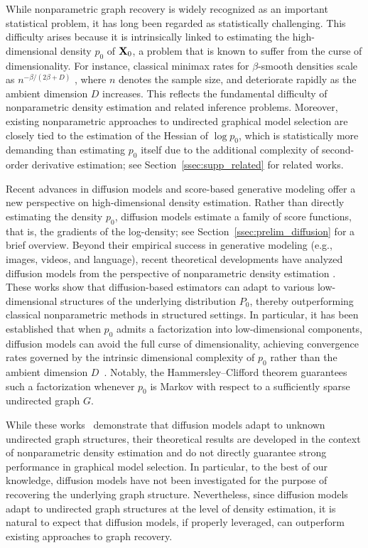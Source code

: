 \documentclass[11pt,a4paper,final]{article}
\numberwithin{equation}{section}
\theoremstyle{remark}
\newcommand{\bX}{{\bf X}}
\begin{document}
While nonparametric graph recovery is widely recognized as an important statistical problem, it has long been regarded as statistically challenging. This difficulty arises because it is intrinsically linked to estimating the high-dimensional density $p_0$ of $\bX_0$, a problem that is known to suffer from the curse of dimensionality. 
For instance, classical minimax rates for $\beta$-smooth densities scale as $n^{-\beta/(2\beta + D)}$ \citep{tsybakov2008introduction}, where $n$ denotes the sample size, and deteriorate rapidly as the ambient dimension $D$ increases. 
This reflects the fundamental difficulty of nonparametric density estimation and related inference problems. 
Moreover, existing nonparametric approaches to undirected graphical model selection are closely tied to the estimation of the Hessian of $\log p_0$, which is statistically more demanding than estimating $p_0$ itself due to the additional complexity of second-order derivative estimation; see Section~\ref{ssec:supp_related} for related works.

Recent advances in diffusion models and score-based generative modeling offer a new perspective on high-dimensional density estimation. 
Rather than directly estimating the density $p_0$, diffusion models estimate a family of score functions, that is, the gradients of the log-density; see Section~\ref{ssec:prelim_diffusion} for a brief overview.
Beyond their empirical success in generative modeling (e.g., images, videos, and language), recent theoretical developments have analyzed diffusion models from the perspective of nonparametric density estimation \citep{oko2023diffusion, kwon2026nonparametric, fan2025optimal, tang2024adaptivity, azangulov2024convergence, stephanovitch2025generalization, chakraborty2026generalization}. 
These works show that diffusion-based estimators can adapt to various low-dimensional structures of the underlying distribution $P_0$, thereby outperforming classical nonparametric methods in structured settings. 
In particular, it has been established that when $p_0$ admits a factorization into low-dimensional components, diffusion models can avoid the full curse of dimensionality, achieving convergence rates governed by the intrinsic dimensional complexity of $p_0$ rather than the ambient dimension $D$~\citep{kwon2026nonparametric, fan2025optimal}.
Notably, the Hammersley--Clifford theorem guarantees such a factorization whenever $p_0$ is Markov with respect to a sufficiently sparse undirected graph $G$.

While these works~\citep{kwon2026nonparametric, fan2025optimal} demonstrate that diffusion models adapt to unknown undirected graph structures, their theoretical results are developed in the context of nonparametric density estimation and do not directly guarantee strong performance in graphical model selection.
In particular, to the best of our knowledge, diffusion models have not been investigated for the purpose of recovering the underlying graph structure.
Nevertheless, since diffusion models adapt to undirected graph structures at the level of density estimation, it is natural to expect that diffusion models, if properly leveraged, can outperform existing approaches to graph recovery.
\end{document}
